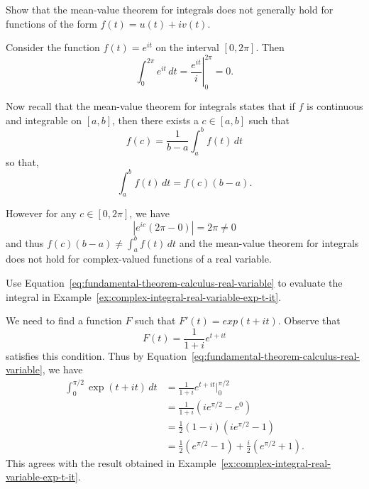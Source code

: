 \begin{example}
    Show that the mean-value theorem for integrals does not generally hold for functions of the form \(f(t) = u(t) + iv(t)\).

    \begin{solution}
        Consider the function \(f(t) = e^{it}\) on the interval \([0, 2\pi]\). Then
        \[
            \int_0^{2\pi} e^{it} \, dt = \left. \frac{e^{it}}{i} \right|_0^{2\pi} = 0.
        \]

        Now recall that the mean-value theorem for integrals states that if \(f\) is continuous and integrable on \([a, b]\), then there exists a \(c \in [a, b]\) such that
        \[
            f(c) = \frac{1}{b-a} \int_a^b f(t) \, dt
        \]
        so that,
        \[
            \int_a^b f(t) \, dt = f(c)(b-a).
        \]

        However for any \(c \in [0, 2\pi]\), we have
        \[
            |e^{ic}(2\pi - 0) | = 2\pi \neq 0
        \]
        and thus \(f(c)(b - a) \neq \int_a^b f(t) \, dt\) and the mean-value theorem for integrals does not hold for complex-valued functions of a real variable.
    \end{solution}
\end{example}

\begin{example}
    Use Equation~\eqref{eq:fundamental-theorem-calculus-real-variable} to evaluate the integral in Example~\ref{ex:complex-integral-real-variable-exp-t-it}.

    \begin{solution}
        We need to find a function \(F\) such that \(F'(t) = exp(t + it)\). Observe that
        \[
            F(t) = \frac{1}{1 + i} e^{t + it}
        \]
        satisfies this condition. Thus by Equation~\eqref{eq:fundamental-theorem-calculus-real-variable}, we have
        \begin{align*}
            \int_0^{\pi/2} \exp(t + it) \, dt &= \frac{1}{1 + i} e^{t + it} \bigg|_0^{\pi/2} \\
            &= \frac{1}{1 + i} (ie^{\pi/2} - e^0) \\
            &= \frac{1}{2} (1 - i)(ie^{\pi/2} - 1) \\
            &= \frac{1}{2} (e^{\pi/2} - 1) + \frac{i}{2} (e^{\pi/2} + 1).
        \end{align*}
        This agrees with the result obtained in Example~\ref{ex:complex-integral-real-variable-exp-t-it}.
    \end{solution}
\end{example}

